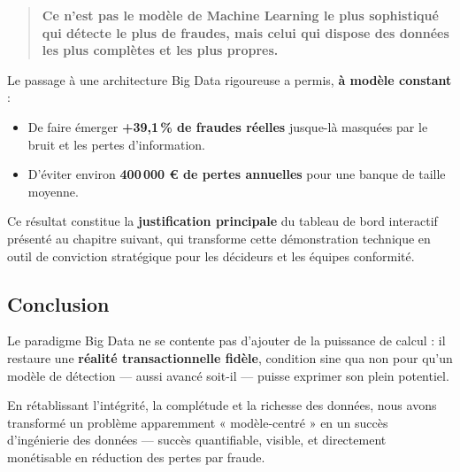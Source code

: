 \begin{quote}
    \textbf{Ce n’est pas le modèle de Machine Learning le plus sophistiqué qui détecte le plus de fraudes, mais celui qui dispose des données les plus complètes et les plus propres.}
\end{quote}

Le passage à une architecture Big Data rigoureuse a permis, \textbf{à modèle constant} :
\begin{itemize}
    \item De faire émerger \textbf{+39,1\,\% de fraudes réelles} jusque-là masquées par le bruit et les pertes d’information.
    \item D'éviter environ \textbf{400\,000 € de pertes annuelles} pour une banque de taille moyenne.
\end{itemize}

Ce résultat constitue la \textbf{justification principale} du tableau de bord interactif présenté au chapitre suivant, qui transforme cette démonstration technique en outil de conviction stratégique pour les décideurs et les équipes conformité.

\begin{samepage}
\section{Conclusion}
Le paradigme Big Data ne se contente pas d’ajouter de la puissance de calcul : il restaure une \textbf{réalité transactionnelle fidèle}, condition sine qua non pour qu’un modèle de détection — aussi avancé soit-il — puisse exprimer son plein potentiel.

En rétablissant l’intégrité, la complétude et la richesse des données, nous avons transformé un problème apparemment « modèle-centré » en un succès d’ingénierie des données — succès quantifiable, visible, et directement monétisable en réduction des pertes par fraude.
\end{samepage}
